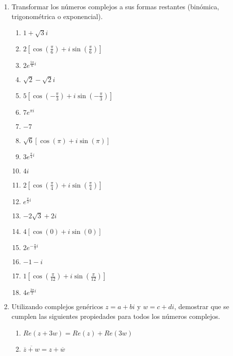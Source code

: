 \documentclass[a4paper]{article}
\newcommand{\exercise}{\item}
\newcommand{\df}[2]{\displaystyle\frac{#1}{#2}}
\newcommand{\conj}[1]{\overline{#1}}
\newcommand{\cis}[1]{\left[\cos\left({#1}\right)+i\sin\left({#1}\right)\right]}
\begin{document}
\begin{enumerate}
\begin{multicols}{3}
\begin{enumerate} [label=(\alph*)]
		\item $3$
		\item $2i$
		\item $-1$
		\item $-5i$
		\item $-\sqrt{2}$
		\item $4i+2$
		\item $1+\sqrt{2}$
		\item $-\df{1}{2}+\df{3}{4}i$
		\item $i-4$
		\item $1+\sqrt{2}-\sqrt{3}i$
	\end{enumerate}
	\end{multicols}
	\exercise Transformar los números complejos a sus formas restantes (binómica, trigonométrica o exponencial).
	\begin{multicols}{3}
	\begin{enumerate} [label=(\alph*)]
		\item $1+\sqrt{3}i$
		\item $2 \cis{\df{\pi}{6}}$
		\item $2e^{\frac{5\pi}{6}i}$
		\item $\sqrt{2}-\sqrt{2}i$
		\item $5 \cis{-\df{\pi}{3}}$
		\item $7e^{\pi i}$
		\item $-7$
		\item $\sqrt{6}\cis{\pi}$
		\item $3e^{\frac{\pi}{4}i}$
		\item $4i$
		\item $2\cis{\df{\pi}{4}}$
		\item $e^{\frac{\pi}{2}i}$
		\item $-2\sqrt{3}+2i$
		\item $4\cis{0}$
		\item $2e^{-\frac{\pi}{3}i}$
		\item $-1-i$
		\item $1\cis{\df{\pi}{12}}$
		\item $4e^{\frac{3\pi}{2}i}$
	\end{enumerate}
	\end{multicols}
	\exercise Utilizando complejos genéricos $z=a+bi$ y $w=c+di$, demostrar que se cumplen las siguientes propiedades para todos los números complejos.
	\begin{multicols}{2}
	\begin{enumerate} [label=(\alph*)]
		\item $Re(z+3w)=Re(z)+Re(3w)$
		\item $\conj{\conj{z}+w}=z+\conj{w}$

\end{enumerate}
\end{multicols}
\end{enumerate}
\end{document}

